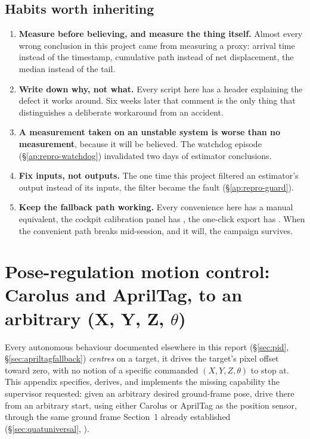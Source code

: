 \subsection{Habits worth inheriting}
\begin{enumerate}[leftmargin=1.4em]
\item \textbf{Measure before believing, and measure the thing itself.} Almost
  every wrong conclusion in this project came from measuring a proxy: arrival
  time instead of the timestamp, cumulative path instead of net displacement,
  the median instead of the tail.
\item \textbf{Write down why, not what.} Every script here has a header
  explaining the defect it works around. Six weeks later that comment is the
  only thing that distinguishes a deliberate workaround from an accident.
\item \textbf{A measurement taken on an unstable system is worse than no
  measurement}, because it will be believed. The watchdog episode
  (\S\ref{ap:repro-watchdog}) invalidated two days of estimator conclusions.
\item \textbf{Fix inputs, not outputs.} The one time this project filtered an
  estimator's output instead of its inputs, the filter became the fault
  (\S\ref{ap:repro-guard}).
\item \textbf{Keep the fallback path working.} Every convenience here has a
  manual equivalent, the cockpit calibration panel has
  , the one-click export has
  . When the convenient path breaks mid-session, and it
  will, the campaign survives.
\end{enumerate}

\section{Pose-regulation motion control: Carolus and AprilTag, to an
arbitrary (X, Y, Z, $\theta$)}
\label{ap:posecontrol}
Every autonomous behaviour documented elsewhere in this report
(\S\ref{sec:pid}, \S\ref{sec:apriltagfallback}) \emph{centres} on a target,
it drives the target's pixel offset toward zero, with no notion of a
specific commanded $(X,Y,Z,\theta)$ to stop at. This appendix specifies,
derives, and implements the missing capability the supervisor requested:
given an arbitrary desired ground-frame pose, drive there from an arbitrary
start, using either Carolus or AprilTag as the position sensor, through the
same ground frame Section~1 already established
(\S\ref{sec:quatuniversal}, ).

